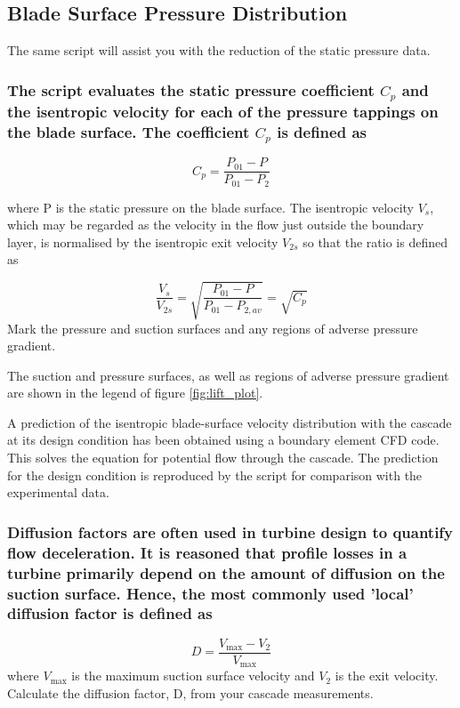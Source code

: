 \documentclass{article}
\begin{document}
\subsection{Blade Surface Pressure Distribution}

The same script will assist you with the reduction of the static pressure data.
\subsubsection{The script evaluates the static pressure coefficient $C_p$ and the isentropic velocity for
each of the pressure tappings on the blade surface. The coefficient $C_p$ is defined as}

\begin{equation}
    C_p = \frac{P_{01} - P}{P_{01} - P_2}
\end{equation}

where P is the static pressure on the blade surface. The isentropic velocity
$V_s$, which may be
regarded as the velocity in the flow just outside the boundary layer, is normalised by the
isentropic exit velocity
$V_{2s}$ so that the ratio is defined as

\begin{equation}
    \frac{V_s}{V_{2s}} = \sqrt{\frac{P_{01} - P}{P_{01} - P_{2,av}}} = \sqrt{C_p}
\end{equation}
Mark the pressure and suction surfaces and any regions of adverse pressure gradient.

The suction and pressure surfaces, as well as regions of adverse pressure gradient are shown in the legend of figure \ref{fig:lift_plot}.

A prediction of the isentropic blade-surface velocity distribution with the cascade at its
design condition has been obtained using a boundary element CFD code. This solves the
equation for potential flow through the cascade. The prediction for the design condition is
reproduced by the script for comparison with the experimental data.

\subsubsection{Diffusion factors are often used in turbine design to quantify flow deceleration. It is
reasoned that profile losses in a turbine primarily depend on the amount of diffusion on the
suction surface. Hence, the most commonly used 'local' diffusion factor is defined as
}

\begin{equation}
    D = \frac{V_\text{max} - V_2}{V_\text{max}}
\end{equation}
where
$V_\text{max}$ is the maximum suction surface velocity and
$V_2$ is the exit velocity. Calculate the
diffusion factor, D, from your cascade measurements.
\end{document}
